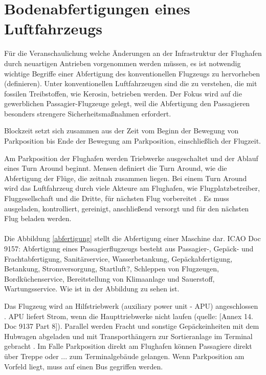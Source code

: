 \section{Bodenabfertigungen eines Luftfahrzeugs}

Für die Veranschaulichung welche Änderungen an der Infrastruktur der Flughafen durch neuartigen Antrieben vorgenommen werden müssen, 
es ist notwendig wichtige Begriffe einer Abfertigung des konventionellen Flugzeugs zu hervorheben (definieren). 
Unter konventionellen Luftfahrzeugen sind die zu verstehen,
die mit fossilen Treibstoffen, wie Kerosin, betrieben werden. Der Fokus wird auf die gewerblichen Passagier-Flugzeuge gelegt,
weil die Abfertigung den Passagieren besonders strengere Sicherheitsmaßnahmen erfordert.


Blockzeit setzt sich zusammen aus der Zeit vom Beginn der Bewegung von Parkposition bis Ende der Bewegung am Parkposition, 
einschließlich der Flugzeit.

Am Parkposition der Flughafen werden Triebwerke ausgeschaltet und der Ablauf eines Turn Around beginnt. 
Mensen \cite{mensen2013handbuch} definiert die Turn Around, wie die Abfertigung der Flüge, die zeitnah zusammen liegen.
Bei einem Turn Around wird das Luftfahrzeug durch viele Akteure am Flughafen, wie Flugplatzbetreiber, Fluggesellschaft und die Dritte, für 
nächsten Flug vorbereitet \cite{mensen2013handbuch}. Es muss ausgeladen, kontrolliert, gereinigt, anschließend versorgt 
und für den nächsten Flug beladen werden. \\
\\
Die Abbildung \ref{abfertigung} stellt die Abfertigung einer Maschine dar.
ICAO Doc 9157: Abfertigung eines Passagierflugzeugs besteht aus Passagier-, Gepäck- und Frachtabfertigung, 
Sanitärservice, Wasserbetankung, Gepäckabfertigung, Betankung, Stromversorgung,
Startluft?, Schleppen von Flugzeugen, Bordküchenservice, Bereitstellung von Klimaanlage und Sauerstoff, Wartungsservice. 
Wie ist in der Abbildung zu sehen ist.

Das Flugzeug wird an Hilfstriebwerk (auxiliary power unit - APU) angeschlossen \cite{mensen2013handbuch}. 
APU liefert Strom, wenn die Haupttriebwerke nicht laufen (quelle: [Annex 14. Doc 9137 Part 8]).
Parallel werden Fracht und sonstige Gepäckeinheiten mit dem Hubwagen abgeladen und mit Transporthängern zur Sortieranlage 
im Terminal gebracht \cite{mensen2013handbuch}. Im Falle Parkposition direkt am Flughafen können Passagiere direkt über Treppe oder ... 
zum Terminalgebäude gelangen. Wenn Parkposition am Vorfeld liegt, muss auf einen Bus gegriffen werden. 

